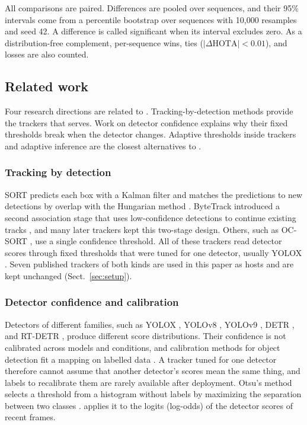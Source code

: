 All comparisons are paired. Differences are pooled over sequences, and their
95\% intervals come from a percentile bootstrap over sequences
\cite{efron1993bootstrap} with 10,000 resamples and seed 42. A difference is
called significant when its interval excludes zero. As a distribution-free
complement, per-sequence wins, ties ($|\Delta\mathrm{HOTA}|<0.01$), and losses
are also counted.

\subsection{Related work}\label{sec:lit}

Four research directions are related to \scl{}. Tracking-by-detection methods provide the
trackers that \scl{} serves. Work on detector confidence explains why their
fixed thresholds break when the detector changes. Adaptive thresholds inside
trackers and adaptive inference are the closest alternatives to \scl{}.

\subsubsection{Tracking by detection}
SORT predicts each box with a Kalman filter and matches the predictions to new
detections by overlap with the Hungarian method \cite{bewley2016sort}.
ByteTrack introduced a second association stage that uses low-confidence
detections to continue existing tracks \cite{zhang2022bytetrack}, and many
later trackers kept this two-stage design. Others, such as OC-SORT
\cite{cao2023ocsort}, use a single confidence threshold. All of these
trackers read detector scores through fixed thresholds that were tuned for
one detector, usually YOLOX \cite{ge2021yolox}. Seven published trackers of
both kinds are used in this paper as hosts and are kept unchanged
(Sect.~\ref{sec:setup}).

\subsubsection{Detector confidence and calibration}
Detectors of different families, such as YOLOX \cite{ge2021yolox}, YOLOv8
\cite{jocher2023yolov8}, YOLOv9 \cite{wang2024yolov9}, DETR
\cite{carion2020detr}, and RT-DETR
\cite{zhao2024rtdetr}, produce different score distributions. Their confidence
is not calibrated across models and conditions, and calibration methods for
object detection fit a mapping on labelled data \cite{kuppers2020detcalib}.
A tracker tuned for one detector therefore cannot assume that another
detector's scores mean the same thing, and labels to recalibrate them are
rarely available after deployment. Otsu's method selects a threshold from a histogram without labels by
maximizing the separation between two classes \cite{otsu1979}. \scl{}
applies it to the logits (log-odds) of the detector scores of recent frames.

